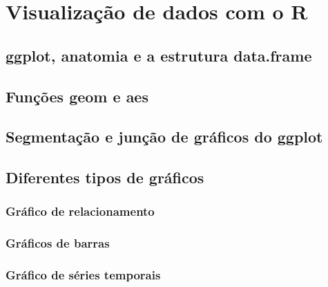 \documentclass[
]{book}
\begin{document}
\hypertarget{visu}{%
\chapter{Visualização de dados com o R}\label{visu}}

\hypertarget{ggplot-anatomia-e-a-estrutura-data.frame}{%
\section{ggplot, anatomia e a estrutura data.frame}\label{ggplot-anatomia-e-a-estrutura-data.frame}}

\hypertarget{funuxe7uxf5es-geom-e-aes}{%
\section{Funções geom e aes}\label{funuxe7uxf5es-geom-e-aes}}

\hypertarget{segmentauxe7uxe3o-e-junuxe7uxe3o-de-gruxe1ficos-do-ggplot}{%
\section{Segmentação e junção de gráficos do ggplot}\label{segmentauxe7uxe3o-e-junuxe7uxe3o-de-gruxe1ficos-do-ggplot}}

\hypertarget{diferentes-tipos-de-gruxe1ficos}{%
\section{Diferentes tipos de gráficos}\label{diferentes-tipos-de-gruxe1ficos}}

\hypertarget{gruxe1fico-de-relacionamento}{%
\subsection{Gráfico de relacionamento}\label{gruxe1fico-de-relacionamento}}

\hypertarget{gruxe1ficos-de-barras}{%
\subsection{Gráficos de barras}\label{gruxe1ficos-de-barras}}

\hypertarget{gruxe1fico-de-suxe9ries-temporais}{%
\subsection{Gráfico de séries temporais}\label{gruxe1fico-de-suxe9ries-temporais}}
\end{document}

